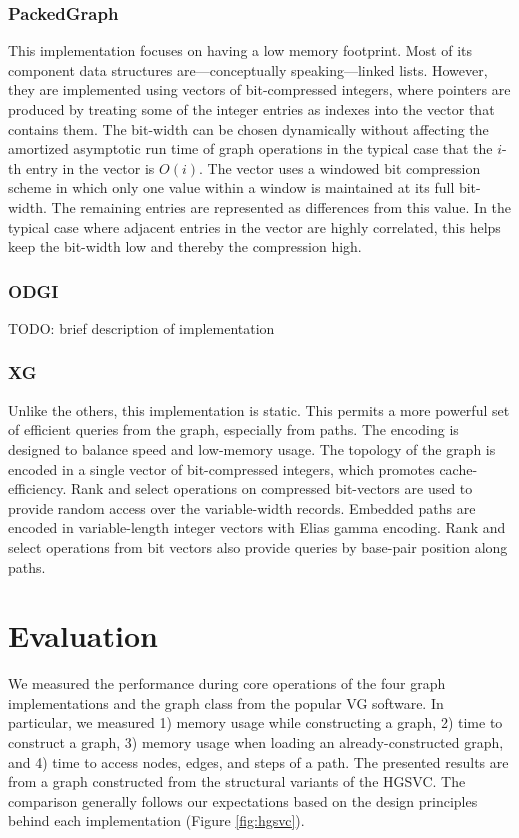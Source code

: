 \documentclass{article}
\begin{document}
\subsubsection{PackedGraph}

This implementation focuses on having a low memory footprint. Most of its component data structures are---conceptually speaking---linked lists. However, they are implemented using vectors of bit-compressed integers, where pointers are produced by treating some of the integer entries as indexes into the vector that contains them. The bit-width can be chosen dynamically without affecting the amortized asymptotic run time of graph operations in the typical case that the $i$-th entry in the vector is $O(i)$. The vector uses a windowed bit compression scheme in which only one value within a window is maintained at its full bit-width. The remaining entries are represented as differences from this value. In the typical case where adjacent entries in the vector are highly correlated, this helps keep the bit-width low and thereby the compression high. 

\subsubsection{ODGI}

TODO: brief description of implementation

\subsubsection{XG}

Unlike the others, this implementation is static. This permits a more powerful set of efficient queries from the graph, especially from paths. The encoding is designed to balance speed and low-memory usage. The topology of the graph is encoded in a single vector of bit-compressed integers, which promotes cache-efficiency. Rank and select operations on compressed bit-vectors are used to provide random access over the variable-width records. Embedded paths are encoded in variable-length integer vectors with Elias gamma encoding. Rank and select operations from bit vectors also provide queries by base-pair position along paths.

\section{Evaluation}

We measured the performance during core operations of the four graph implementations and the graph class from the popular VG software. In particular, we measured 1) memory usage while constructing a graph, 2) time to construct a graph, 3) memory usage when loading an already-constructed graph, and 4) time to access nodes, edges, and steps of a path. The presented results are from a graph constructed from the structural variants of the HGSVC. The comparison generally follows our expectations based on the design principles behind each implementation (Figure \ref{fig:hgsvc}).
\end{document}
